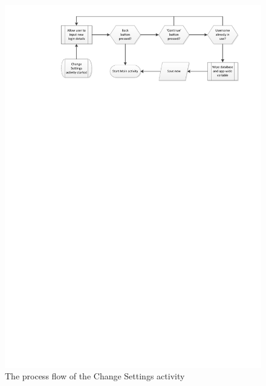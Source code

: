 \begin{figure}
 \centering 
 \includegraphics[clip = true, trim = 0 650 0 0,
 scale=0.7]{change_settings_processflow}
 \caption{The process flow of the Change Settings activity}
 \label{fig:change-user-settings}
\end{figure}

